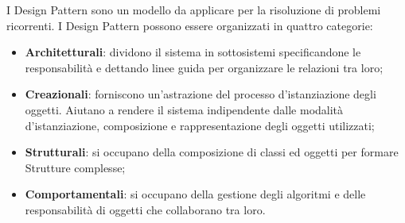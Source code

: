 I Design Pattern sono un modello da applicare per la risoluzione di problemi ricorrenti. I Design Pattern possono essere organizzati in quattro categorie:
	\begin{itemize}
		\item \textbf{Architetturali}: dividono il sistema in sottosistemi specificandone le responsabilità e dettando linee guida per organizzare le relazioni tra loro;
		\item \textbf{Creazionali}: forniscono un'astrazione del processo d'istanziazione degli oggetti. Aiutano a rendere il sistema indipendente dalle modalità d'istanziazione, composizione e rappresentazione degli oggetti utilizzati;
		\item \textbf{Strutturali}: si occupano della composizione di classi ed oggetti per formare Strutture complesse;
		\item \textbf{Comportamentali}: si occupano della gestione degli algoritmi e delle responsabilità di oggetti che collaborano tra loro.
	\end{itemize}
	

